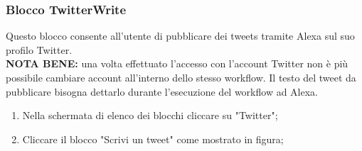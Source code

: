 \subsubsection{Blocco TwitterWrite} \label{twitterW}
Questo blocco consente all'utente di pubblicare dei tweets tramite Alexa sul suo profilo Twitter. \\
\textbf{NOTA BENE:} una volta effettuato l'accesso con l'account Twitter non è più possibile cambiare account all'interno dello stesso workflow. Il testo del tweet da pubblicare bisogna dettarlo durante l'esecuzione del workflow ad Alexa.
\newpage
\begin{enumerate}
	\item Nella schermata di elenco dei blocchi cliccare su "Twitter";
	\item Cliccare il blocco "Scrivi un tweet" come mostrato in figura;
	\begin{figure}[!ht]
		\centering

\end{figure}
\end{enumerate}
